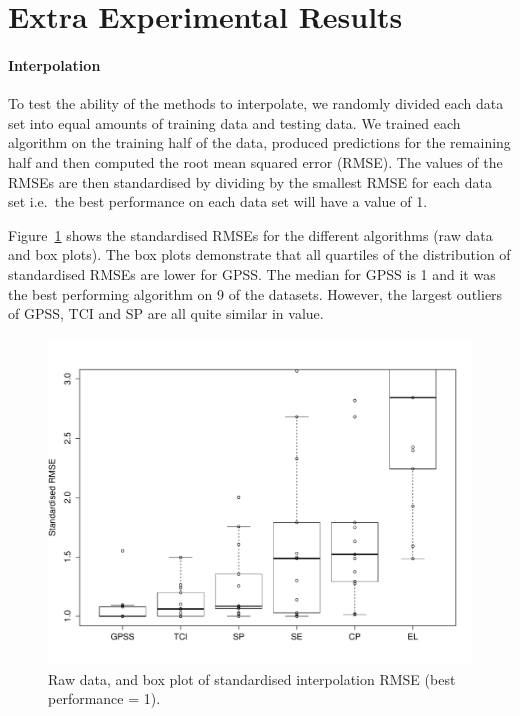\documentclass{article}
\def\ie{i.e.\ }
\begin{document}
\section{Extra Experimental Results}
\paragraph{Interpolation}

To test the ability of the methods to interpolate, we randomly divided each data set into equal amounts of training data and testing data.
We trained each algorithm on the training half of the data, produced predictions for the remaining half and then computed the root mean squared error (RMSE).
The values of the RMSEs are then standardised by dividing by the smallest RMSE for each data set \ie the best performance on each data set will have a value of 1.

Figure~\ref{fig:box_interp} shows the standardised RMSEs for the different algorithms (raw data and box plots).
The box plots demonstrate that all quartiles of the distribution of standardised RMSEs are lower for GPSS.
The median for GPSS is 1 and it was the best performing algorithm on 9 of the datasets.
However, the largest outliers of GPSS, TCI and SP are all quite similar in value.

\begin{figure}[h]
\centering
\includegraphics[width=\columnwidth]{figures/box_interp}
\caption{
Raw data, and box plot of standardised interpolation RMSE (best performance = 1).
}
\label{fig:box_interp}
\end{figure}
\end{document}
